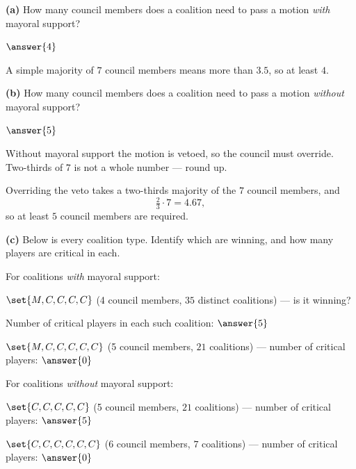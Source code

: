 \documentclass[12pt]{ximera}
\begin{document}
\begin{problem}
\begin{prompt}
\textbf{(a)} How many council members does a coalition need to pass a motion
\emph{with} mayoral support?

$\answer{4}$

\begin{feedback}
A simple majority of $7$ council members means more than $3.5$, so at least $4$.
\end{feedback}
\end{prompt}

\begin{prompt}
\textbf{(b)} How many council members does a coalition need to pass a motion
\emph{without} mayoral support?

$\answer{5}$

\begin{hint}
Without mayoral support the motion is vetoed, so the council must override. Two-thirds
of $7$ is not a whole number --- round up.
\end{hint}

\begin{feedback}
Overriding the veto takes a two-thirds majority of the $7$ council members, and
\[ \tfrac23 \cdot 7 = 4.67, \]
so at least $5$ council members are required.
\end{feedback}
\end{prompt}

\begin{prompt}
\textbf{(c)} Below is every coalition type. Identify which are winning, and how many
players are critical in each.

For coalitions \emph{with} mayoral support:

$\set{M, C, C, C, C}$ (4 council members, $35$ distinct coalitions) --- is it winning?
\begin{multipleChoice}
\end{multipleChoice}
Number of critical players in each such coalition: $\answer{5}$

\smallskip
$\set{M, C, C, C, C, C}$ (5 council members, $21$ coalitions) --- number of critical
players: $\answer{0}$

\smallskip
For coalitions \emph{without} mayoral support:

$\set{C, C, C, C, C}$ (5 council members, $21$ coalitions) --- number of critical
players: $\answer{5}$

\smallskip
$\set{C,C,C,C,C,C}$ (6 council members, $7$ coalitions) --- number of critical
players: $\answer{0}$


\end{prompt}
\end{problem}
\end{document}
